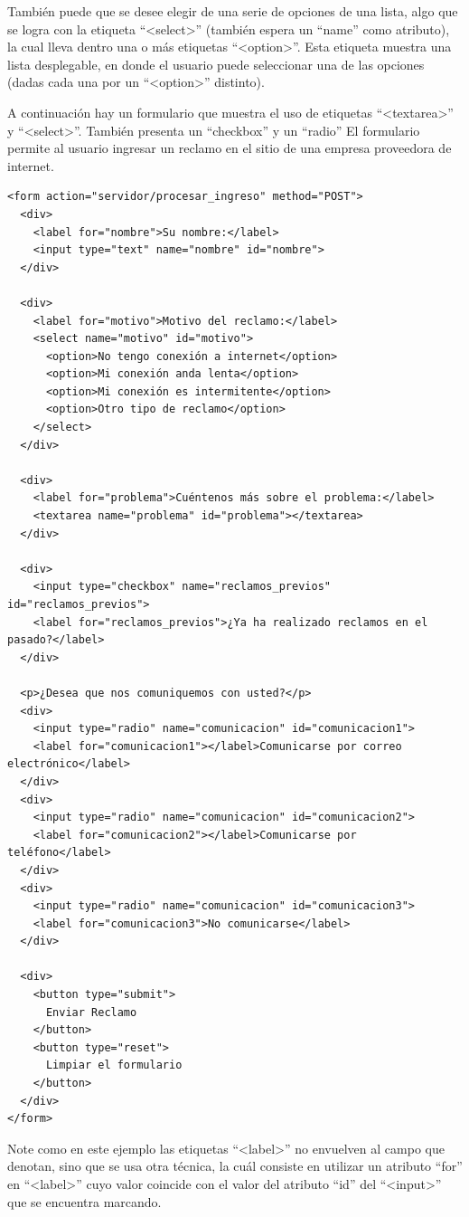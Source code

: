 También puede que se desee elegir de una serie de opciones de una lista, algo
que se logra con la etiqueta ``<select>'' (también espera un ``name'' como
atributo), la cual lleva dentro una o más etiquetas ``<option>''. Esta etiqueta
muestra una lista desplegable, en donde el usuario puede seleccionar una de las
opciones (dadas cada una por un ``<option>'' distinto).

A continuación hay un formulario que muestra el uso de etiquetas ``<textarea>'' y
``<select>''. También presenta un ``checkbox'' y un ``radio'' El formulario
permite al usuario ingresar un reclamo en el sitio
de una empresa proveedora de internet.

\begin{lstlisting}[language=XHTML]
<form action="servidor/procesar_ingreso" method="POST">
  <div>
    <label for="nombre">Su nombre:</label>
    <input type="text" name="nombre" id="nombre">
  </div>

  <div>
    <label for="motivo">Motivo del reclamo:</label>
    <select name="motivo" id="motivo">
      <option>No tengo conexión a internet</option>
      <option>Mi conexión anda lenta</option>
      <option>Mi conexión es intermitente</option>
      <option>Otro tipo de reclamo</option>
    </select>
  </div>

  <div>
    <label for="problema">Cuéntenos más sobre el problema:</label>
    <textarea name="problema" id="problema"></textarea>
  </div>

  <div>
    <input type="checkbox" name="reclamos_previos" id="reclamos_previos">
    <label for="reclamos_previos">¿Ya ha realizado reclamos en el pasado?</label>
  </div>

  <p>¿Desea que nos comuniquemos con usted?</p>
  <div>
    <input type="radio" name="comunicacion" id="comunicacion1">
    <label for="comunicacion1"></label>Comunicarse por correo electrónico</label>
  </div>  
  <div>
    <input type="radio" name="comunicacion" id="comunicacion2">
    <label for="comunicacion2"></label>Comunicarse por teléfono</label>
  </div>
  <div>
    <input type="radio" name="comunicacion" id="comunicacion3">
    <label for="comunicacion3">No comunicarse</label>
  </div>
  
  <div>
    <button type="submit">
      Enviar Reclamo
    </button>
    <button type="reset">
      Limpiar el formulario
    </button>
  </div>
</form>
\end{lstlisting}

Note como en este ejemplo las etiquetas ``<label>'' no envuelven al campo
que denotan, sino que se usa otra técnica, la cuál consiste en utilizar
un atributo ``for'' en ``<label>'' cuyo valor coincide con el valor del
atributo ``id'' del ``<input>'' que se encuentra marcando.

